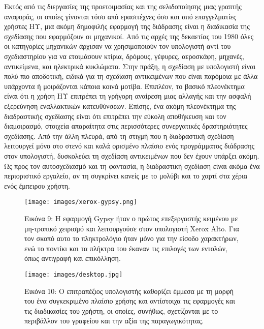 \documentclass[
]{article}
\begin{document}
Εκτός από τις διεργασίες της προετοιμασίας και της σελιδοποίησης μιας
γραπτής αναφοράς, οι οποίες γίνονται τόσο από ερασιτέχνες όσο και από
επαγγελματίες χρήστες ΗΥ, μια ακόμη δημοφιλής εφαρμογή της διάδρασης
είναι η διαδικασία της σχεδίασης που εφαρμόζουν οι μηχανικοί. Από τις
αρχές της δεκαετίας του 1980 όλες οι κατηγορίες μηχανικών άρχισαν να
χρησιμοποιούν τον υπολογιστή αντί του σχεδιαστηρίου για να ετοιμάσουν
κτίρια, δρόμους, γέφυρες, αεροσκάφη, μηχανές, αντικείμενα, και ηλεκτρικά
κυκλώματα. Στην πράξη, η σχεδίαση με υπολογιστή είναι πολύ πιο
αποδοτική, ειδικά για τη σχεδίαση αντικειμένων που είναι παρόμοια με
άλλα υπάρχοντα ή μοιράζονται κάποια κοινά μοτίβα. Επιπλέον, το βασικό
πλεονέκτημα είναι ότι η χρήση ΗΥ επιτρέπει τη γρήγορη αναίρεση μιας
αλλαγής και την ασφαλή εξερεύνηση εναλλακτικών κατευθύνσεων. Επίσης, ένα
ακόμη πλεονέκτημα της διαδραστικής σχεδίασης είναι ότι επιτρέπει την
εύκολη αποθήκευση και τον διαμοιρασμό, στοιχεία απαραίτητα στις
περισσότερες συνεργατικές δραστηριότητες σχεδίασης. Από την άλλη πλευρά,
από τη στιγμή που η διαδραστική σχεδίαση λειτουργεί μόνο στο στενό και
καλά ορισμένο πλαίσιο ενός προγράμματος διάδρασης στον υπολογιστή,
δυσκολεύει τη σχεδίαση αντικειμένων που δεν έχουν υπάρξει ακόμη.\\
Ως προς τον αυτοσχεδιασμό και τη φαντασία, η διαδραστική σχεδίαση είναι
ακόμα ένα περιοριστικό εργαλείο, αν τη συγκρίνει κανείς με το μολύβι και
το χαρτί στα χέρια ενός έμπειρου χρήστη.

\leavevmode{}%
\begin{figure}
\hypertarget{fig:xerox-gypsy}{%
\centering
\texttt{[image: images/xerox-gypsy.png]}
\caption{Εικόνα 9: Η εφαρμογή Gypsy ήταν ο πρώτος επεξεργαστής κειμένου
με μη-τροπικό χειρισμό και λειτουργούσε στον υπολογιστή Xerox Alto. Για
τον σκοπό αυτο το πληκτρολόγιο ήταν μόνο για την είσοδο χαρακτήρων, ενώ
το ποντίκι και τα πλήκτρα του έκαναν τις επιλογές των εντολών, όπως
αντιγραφή και επικόλληση.}\label{fig:xerox-gypsy}
}
\end{figure}

\leavevmode{}%
\begin{figure}
\hypertarget{fig:desktop}{%
\centering
\texttt{[image: images/desktop.jpg]}
\caption{Εικόνα 10: Ο επιτραπέζιος υπολογιστής καθορίζει έμμεσα με τη
μορφή του ένα συγκεκριμένο πλαίσιο χρήσης και αντίστοιχα τις εφαρμογές
και τις διαδικασίες του χρήστη, οι οποίες, συνήθως, σχετίζονται με το
περιβάλλον του γραφείου και την αξία της
παραγωγικότητας.}\label{fig:desktop}
}
\end{figure}
\end{document}
